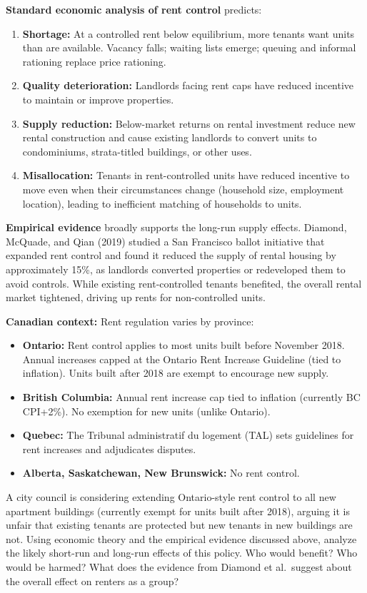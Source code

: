 \textbf{Standard economic analysis of rent control} predicts:
\begin{enumerate}
  \item \textbf{Shortage:} At a controlled rent below equilibrium, more tenants want units than are available. Vacancy falls; waiting lists emerge; queuing and informal rationing replace price rationing.
  \item \textbf{Quality deterioration:} Landlords facing rent caps have reduced incentive to maintain or improve properties.
  \item \textbf{Supply reduction:} Below-market returns on rental investment reduce new rental construction and cause existing landlords to convert units to condominiums, strata-titled buildings, or other uses.
  \item \textbf{Misallocation:} Tenants in rent-controlled units have reduced incentive to move even when their circumstances change (household size, employment location), leading to inefficient matching of households to units.
\end{enumerate}

\textbf{Empirical evidence} broadly supports the long-run supply effects. Diamond, McQuade, and Qian (2019) studied a San Francisco ballot initiative that expanded rent control and found it reduced the supply of rental housing by approximately 15\%, as landlords converted properties or redeveloped them to avoid controls. While existing rent-controlled tenants benefited, the overall rental market tightened, driving up rents for non-controlled units.

\textbf{Canadian context:} Rent regulation varies by province:
\begin{itemize}
  \item \textbf{Ontario:} Rent control applies to most units built before November 2018. Annual increases capped at the Ontario Rent Increase Guideline (tied to inflation). Units built after 2018 are exempt to encourage new supply.
  \item \textbf{British Columbia:} Annual rent increase cap tied to inflation (currently BC CPI+2\%). No exemption for new units (unlike Ontario).
  \item \textbf{Quebec:} The Tribunal administratif du logement (TAL) sets guidelines for rent increases and adjudicates disputes.
  \item \textbf{Alberta, Saskatchewan, New Brunswick:} No rent control.
\end{itemize}

\begin{thinkbox}
A city council is considering extending Ontario-style rent control to all new apartment buildings (currently exempt for units built after 2018), arguing it is unfair that existing tenants are protected but new tenants in new buildings are not. Using economic theory and the empirical evidence discussed above, analyze the likely short-run and long-run effects of this policy. Who would benefit? Who would be harmed? What does the evidence from Diamond et al.\ suggest about the overall effect on renters as a group?
\end{thinkbox}

